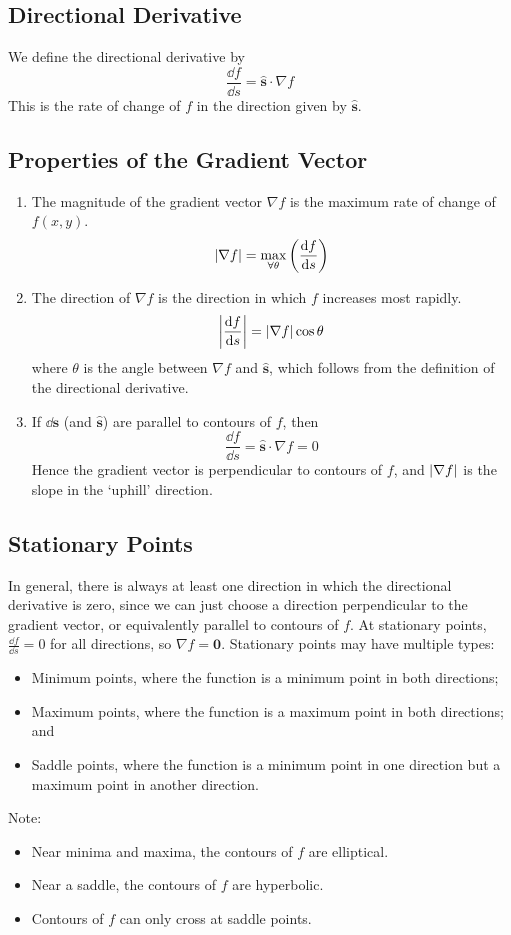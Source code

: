 \documentclass{article}
\begin{document}
	\subsection{Directional Derivative}
	We define the directional derivative by
	\[ \frac{\dd f}{\dd s} = \hat{\bm s} \cdot \nabla f \]
	This is the rate of change of $f$ in the direction given by $\hat{\bm s}$.

	\subsection{Properties of the Gradient Vector}
	\begin{enumerate}
		\item The magnitude of the gradient vector $\nabla f$ is the maximum rate of change of $f(x, y)$.
		\[ \abs{\nabla f} = \max\limits_{\forall \theta} \left( \frac{\dd f}{\dd s} \right) \]
		\item The direction of $\nabla f$ is the direction in which $f$ increases most rapidly.
		\[ \abs{\frac{\dd f}{\dd s}} = \abs{\nabla f}\cos\theta \]
		where $\theta$ is the angle between $\nabla f$ and $\hat{\bm s}$, which follows from the definition of the directional derivative.
		\item If $\dd \bm s$ (and $\hat{\bm s}$) are parallel to contours of $f$, then
		\[ \frac{\dd f}{\dd s} = \hat{\bm s} \cdot \nabla f = 0 \]
		Hence the gradient vector is perpendicular to contours of $f$, and $\abs{\nabla f}$ is the slope in the `uphill' direction.
	\end{enumerate}

	\subsection{Stationary Points}
	In general, there is always at least one direction in which the directional derivative is zero, since we can just choose a direction perpendicular to the gradient vector, or equivalently parallel to contours of $f$. At stationary points, $\frac{\dd f}{\dd s} = 0$ for all directions, so $\nabla f = \bm 0$. Stationary points may have multiple types:
	\begin{itemize}
		\item Minimum points, where the function is a minimum point in both directions;
		\item Maximum points, where the function is a maximum point in both directions; and
		\item Saddle points, where the function is a minimum point in one direction but a maximum point in another direction.
	\end{itemize}
	Note:
	\begin{itemize}
		\item Near minima and maxima, the contours of $f$ are elliptical.
		\item Near a saddle, the contours of $f$ are hyperbolic.
		\item Contours of $f$ can only cross at saddle points.
	\end{itemize}
\end{document}
